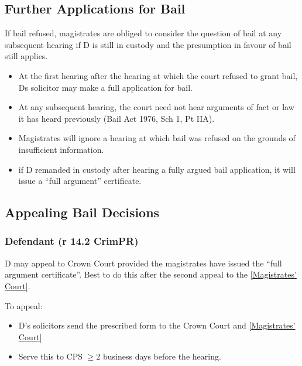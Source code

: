 \documentclass[
]{article}
\providecommand{\tightlist}{%
  \setlength{\itemsep}{0pt}\setlength{\parskip}{0pt}}
\begin{document}
\hypertarget{further-applications-for-bail}{%
\subsection{Further Applications for
Bail}\label{further-applications-for-bail}}

If bail refused, magistrates are obliged to consider the question of
bail at any subsequent hearing if D is still in custody and the
presumption in favour of bail still applies.

\begin{itemize}
\tightlist
\item
  At the first hearing after the hearing at which the court refused to
  grant bail, Ds solicitor may make a full application for bail.
\item
  At any subsequent hearing, the court need not hear arguments of fact
  or law it has heard previously (Bail Act 1976, Sch 1, Pt IIA).
\item
  Magistrates will ignore a hearing at which bail was refused on the
  grounds of insufficient information.
\item
  if D remanded in custody after hearing a fully argued bail
  application, it will issue a ``full argument'' certificate.
\end{itemize}

\hypertarget{appealing-bail-decisions}{%
\subsection{Appealing Bail Decisions}\label{appealing-bail-decisions}}

\hypertarget{defendant-r-14.2-crimpr}{%
\subsubsection{Defendant (r 14.2
CrimPR)}\label{defendant-r-14.2-crimpr}}

D may appeal to Crown Court provided the magistrates have issued the
``full argument certificate''. Best to do this after the second appeal
to the
\href{maximum\%20compensation\%20of\%20£5,000\%20per\%20offence}{{[}Magistrates'
Court{]}}.

To appeal:

\begin{itemize}
\tightlist
\item
  D's solicitors send the prescribed form to the Crown Court and
  \href{maximum\%20compensation\%20of\%20£5,000\%20per\%20offence}{{[}Magistrates'
  Court{]}}
\item
  Serve this to CPS \(\geq 2\) business days before the hearing.
\end{itemize}
\end{document}
